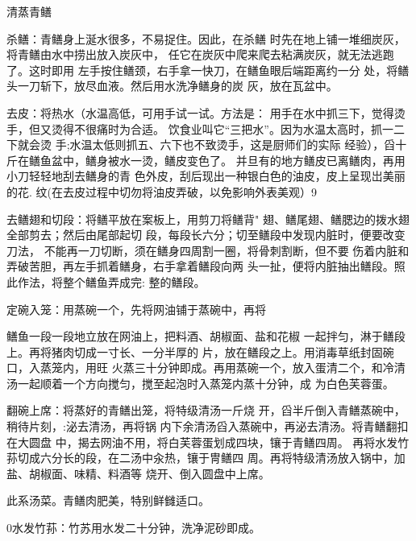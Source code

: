 \begin{recipe}{清蒸青鳝}

\ingredients



\cooking

\step 杀鳝：青鳝身上涎水很多，不易捉住。因此，在杀鳝 时先在地上铺一堆细炭灰，将青鳝由水中捞出放入炭灰中， 任它在炭灰中爬来爬去粘满炭灰，就无法逃跑了。这时即用 左手按住鳝颈，右手拿一快刀，在鳝鱼眼后端距离约一分 处，将鳝头一刀斩下，放尽血液。然后用水洗净鳝身的炭 灰，放在瓦盆中。

\step 去皮：将热水（水温高低，可用手试一试。方法是： 用手在水中抓三下，觉得烫手，但又烫得不很痛时为合适。 饮食业叫它“三把水”。因为水温太高时，抓一二下就会烫 手;水温太低则抓五、六下也不致烫手，这是厨师们的实际 经验），舀十斤在鳝鱼盆中，鳝身被水一烫，鳝皮变色了。 并旦有的地方鳝皮已离鳝肉，再用小刀轻轻地刮去鳝身的青 色外皮，刮后现出一种银白色的油皮，皮上呈现岀美丽的花. 纹(在去皮过程中切勿将油皮弄破，以免影响外表美观）9

\step 去鳝翅和切段：将鳝平放在案板上，用剪刀将鳝背" 翅、鳝尾翅、鳝腮边的拨水翅全部剪去；然后由尾部起切 段，每段长六分；切至鳝段中发现内脏时，便要改变刀法， 不能再一刀切断，须在鳝身四周割一圈，将骨刺割断，但不要 伤着内脏和弄破苦胆，再左手抓着鳝身，右手拿着鳝段向两 头一扯，便将内脏抽出鳝段。照此作法，将整个鳝鱼弄成完: 整的鳝段。

\step 定碗入笼：用蒸碗一个，先将网油铺于蒸碗中，再将

鳝鱼一段一段地立放在网油上，把料酒、胡椒面、盐和花椒 一起拌匀，淋于鳝段上。再将猪肉切成一寸长、一分半厚的 片，放在鳝段之上。用消毒草纸封固碗口，入蒸笼内，用旺 火蒸三十分钟即成。再用蒸碗一个，放入蛋清二个，和冷清 汤一起顺着一个方向搅匀，搅至起泡时入蒸笼内蒸十分钟，成 为白色芙蓉蛋。

\step 翻碗上席：将蒸好的青鳝出笼，将特级清汤一斤烧 开，舀半斤倒入青鳝蒸碗中，稍待片刻，:泌去清汤，再将锅 内下余清汤舀入蒸碗中，再泌去清汤。将青鳝翻扣在大圆盘 中，揭去网油不用，将白芙蓉蛋划成四块，镶于青鳝四周。 再将水发竹荪切成六分长的段，在二汤中汆热，镶于冑鳝四 周。再将特级清汤放入锅中，加盐、胡椒面、味精、料酒等 烧开、倒入圆盘中上席。

\notes

此系汤菜。青鳝肉肥美，特别鲜雠适口。

0水发竹荪：竹苏用水发二十分钟，洗净泥砂即成。

\end{recipe}

